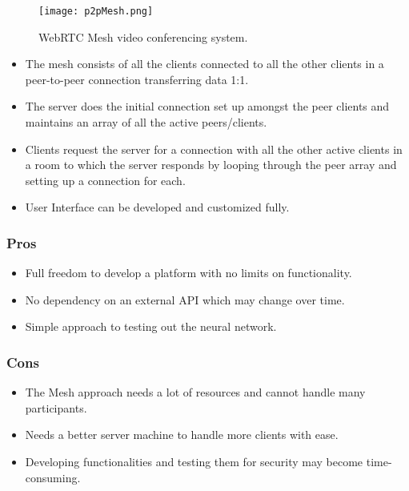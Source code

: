\begin{figure}
    \begin{center}
        \texttt{[image: p2pMesh.png]}
    \end{center}
    \caption{WebRTC Mesh video conferencing system.}
    \label{fig:p2pMesh}
\end{figure}

\begin{itemize}
    \item The mesh consists of all the clients connected to all the other clients in a peer-to-peer connection transferring data 1:1.
    \item The server does the initial connection set up amongst the peer clients and maintains an array of all the active peers/clients.
    \item Clients request the server for a connection with all the other active clients in a room to which the server responds by looping through the peer array and setting up a connection for each.
    \item User Interface can be developed and customized fully.
\end{itemize}

\subsubsection{Pros}

\begin{itemize}
    \item Full freedom to develop a platform with no limits on functionality.
    \item No dependency on an external API which may change over time.
    \item Simple approach to testing out the neural network.
\end{itemize}

\subsubsection{Cons}

\begin{itemize}
    \item The Mesh approach needs a lot of resources and cannot handle many participants.
    \item Needs a better server machine to handle more clients with ease.
    \item Developing functionalities and testing them for security may become time-consuming.
\end{itemize}

